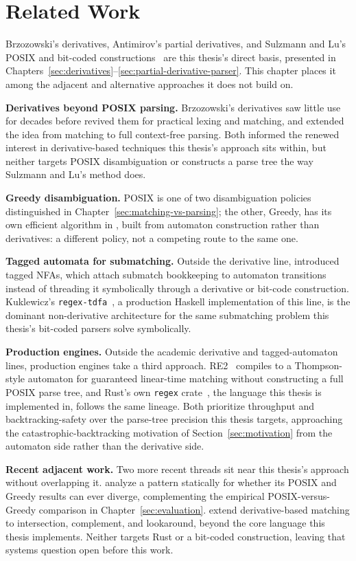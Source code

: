 \chapter{Related Work}
\label{sec:related-work}

Brzozowski's derivatives, Antimirov's partial derivatives, and Sulzmann
and Lu's POSIX and bit-coded constructions~\citep{brzozowski1964,
antimirov1996, sulzmannlu2014, sulzmannlu2012} are this thesis's direct
basis, presented in
Chapters~\ref{sec:derivatives}--\ref{sec:partial-derivative-parser}.
This chapter places it among the adjacent and alternative approaches
it does not build on.

\textbf{Derivatives beyond POSIX parsing.} Brzozowski's derivatives
saw little use for decades before \citet{owens2009} revived them for
practical lexing and matching, and \citet{mightdaraisspiewak2011}
extended the idea from matching to full context-free parsing. Both
informed the renewed interest in derivative-based techniques this
thesis's approach sits within, but neither targets POSIX
disambiguation or constructs a parse tree the way Sulzmann and Lu's
method does.

\textbf{Greedy disambiguation.} POSIX is one of two disambiguation
policies distinguished in Chapter~\ref{sec:matching-vs-parsing}; the
other, Greedy, has its own efficient algorithm in
\citet{frischcardelli2004}, built from automaton construction rather
than derivatives: a different policy, not a competing route to the
same one.

\textbf{Tagged automata for submatching.} Outside the derivative line,
\citet{laurikari2000} introduced tagged NFAs, which attach submatch
bookkeeping to automaton transitions instead of threading it
symbolically through a derivative or bit-code construction.
Kuklewicz's \texttt{regex-tdfa}~\citep{kuklewicz_tdfa}, a production
Haskell implementation of this line, is the dominant non-derivative
architecture for the same submatching problem this thesis's
bit-coded parsers solve symbolically.

\textbf{Production engines.} Outside the academic derivative and
tagged-automaton lines, production engines take a third approach.
RE2~\citep{re2} compiles to a Thompson-style automaton for guaranteed
linear-time matching without constructing a full POSIX parse tree, and
Rust's own \texttt{regex} crate~\citep{rust_regex}, the language this
thesis is implemented in, follows the same lineage. Both prioritize
throughput and backtracking-safety over the parse-tree precision this
thesis targets, approaching the catastrophic-backtracking motivation
of Section~\ref{sec:motivation} from the automaton side rather than
the derivative side.

\textbf{Recent adjacent work.} Two more recent threads sit near this
thesis's approach without overlapping it. \citet{mamouras2024}
analyze a pattern statically for whether its POSIX and Greedy results
can ever diverge, complementing the empirical POSIX-versus-Greedy
comparison in Chapter~\ref{sec:evaluation}.
\citet{varatalu2023} extend derivative-based matching to intersection,
complement, and lookaround, beyond the core language this thesis
implements. Neither targets Rust or a bit-coded construction, leaving
that systems question open before this work.

